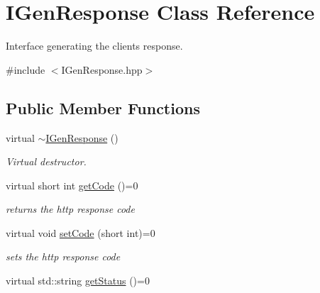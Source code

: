 \hypertarget{class_i_gen_response}{}\section{I\+Gen\+Response Class Reference}
\label{class_i_gen_response}


Interface generating the client\textquotesingle{}s response.  




{\ttfamily \#include $<$I\+Gen\+Response.\+hpp$>$}

\subsection*{Public Member Functions}
\begin{DoxyCompactItemize}
\item 
\hypertarget{class_i_gen_response_a7bba543b82c41a64ff9171893507a1ff}{}virtual \hyperlink{class_i_gen_response_a7bba543b82c41a64ff9171893507a1ff}{$\sim$\+I\+Gen\+Response} ()\label{class_i_gen_response_a7bba543b82c41a64ff9171893507a1ff}

\begin{DoxyCompactList}\small\item\em Virtual destructor. \end{DoxyCompactList}\item 
\hypertarget{class_i_gen_response_a827a1ccea6a15a30ac8657c81a1ed148}{}virtual short int \hyperlink{class_i_gen_response_a827a1ccea6a15a30ac8657c81a1ed148}{get\+Code} ()=0\label{class_i_gen_response_a827a1ccea6a15a30ac8657c81a1ed148}

\begin{DoxyCompactList}\small\item\em returns the http response code \end{DoxyCompactList}\item 
\hypertarget{class_i_gen_response_a5b8581251abed0aa2672ccc80bdaa6d0}{}virtual void \hyperlink{class_i_gen_response_a5b8581251abed0aa2672ccc80bdaa6d0}{set\+Code} (short int)=0\label{class_i_gen_response_a5b8581251abed0aa2672ccc80bdaa6d0}

\begin{DoxyCompactList}\small\item\em sets the http response code \end{DoxyCompactList}\item 
\hypertarget{class_i_gen_response_abda4b1bd089fbeaa89f948bee724fc18}{}virtual std\+::string \hyperlink{class_i_gen_response_abda4b1bd089fbeaa89f948bee724fc18}{get\+Status} ()=0\label{class_i_gen_response_abda4b1bd089fbeaa89f948bee724fc18}


\end{DoxyCompactItemize}
